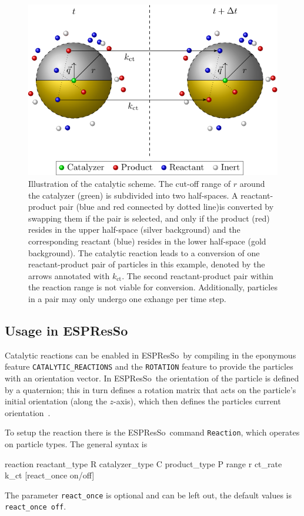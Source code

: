 \documentclass[aip,jcp,reprint,a4paper,onecolumn,nofootinbib,amsmath,amssymb]{revtex4-1}
\newcommand\code{\lstinline}
\newcommand{\es}{\mbox{\textsf{ESPResSo}}\xspace}
\newcommand\codees{\lstinline[language=espresso]}
\begin{document}
\begin{figure}
  \centering
  \includegraphics{FIGURES/number-conserving}
  \caption{\label{fig:nc}Illustration of the catalytic scheme. The cut-off range of $r$ around the catalyzer (green) is subdivided into two half-spaces. A reactant-product pair (blue and red connected by dotted line)is converted by swapping them if the pair is selected, and only if the product (red) resides in the upper half-space (silver background) and the corresponding reactant (blue) resides in the lower half-space (gold background). The catalytic reaction leads to a conversion of one reactant-product pair of particles in this example, denoted by the arrows annotated with $k_{\text{ct}}$. The second reactant-product pair within the reaction range is not viable for conversion. Additionally, particles in a pair may only undergo one exhange per time step.}
\end{figure}

\subsection{Usage in \es}

Catalytic reactions can be enabled in \es\ by compiling in the eponymous feature \code{CATALYTIC_REACTIONS} and the \code{ROTATION} feature to provide the particles with an orientation vector. In \es\ the orientation of the particle is defined by a quaternion; this in turn defines a rotation matrix that acts on the particle's initial orientation (along the $z$-axis), which then defines the particles current orientation~\cite{UG,Limbach_06,Arnold_13}.

To setup the reaction there is the \es\ command \codees{Reaction}, which operates on particle types. The general syntax is
\begin{espresso}
reaction reactant_type R catalyzer_type C product_type P range r ct_rate k_ct
    [react_once on/off]
\end{espresso}
The parameter \codees{react_once} is optional and can be left out, the default values is \codees{react_once off}.
\end{document}
